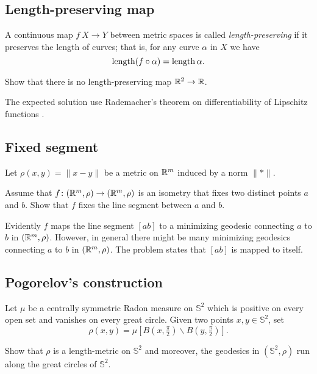 \subsection*{Length-preserving map\thm}
\label{two2one} 

A continuous map $f\:X\to Y$ between metric spaces is called \emph{length-preserving} if it preserves the length of curves; 
that is, for any curve $\alpha$ in $X$ we have
\[\operatorname{\rm length}(f\circ\alpha)=\operatorname{\rm length}\alpha.\]

\begin{pr}
Show that there is no length-preserving map $\mathbb{R}^2\to \mathbb{R}$.
\end{pr}


The expected solution use Rademacher's theorem on differentiability of Lipschitz functions \cite[see][]{rademacher}. 



\subsection*{Fixed segment}
\label{Fixed segment}

\begin{pr}
Let $\rho(x,y)=\|x-y\|$ be a metric on $\mathbb{R}^m$ induced by a norm $\|{*}\|$.

Assume that $f\colon(\mathbb{R}^m,\rho)\to(\mathbb{R}^m,\rho)$ is an isometry that fixes two distinct points $a$ and $b$.
Show that $f$ fixes the line segment between $a$ and $b$.
\end{pr}

Evidently $f$ maps the line segment $[ab]$ to a minimizing geodesic connecting $a$ to $b$ in $(\mathbb{R}^m,\rho)$.
However, in general there might be many minimizing geodesics connecting $a$ to $b$ in $(\mathbb{R}^m,\rho)$.
The problem states that $[ab]$ is mapped to itself.


\subsection*{Pogorelov's construction\easy}
\label{Pogorelov's construction}

\begin{pr}
Let $\mu$ be a centrally symmetric Radon measure on $\mathbb{S}^2$ which is positive on every open set and vanishes on every great circle.
Given two points $x,y\in \mathbb{S}^2$,
set 
\[\rho(x,y)=\mu[B(x,\tfrac \pi2)\backslash B(y,\tfrac\pi2)].\]

Show that $\rho$ is a length-metric on $\mathbb{S}^2$
and moreover, the geodesics in $(\mathbb{S}^2,\rho)$ run along the great circles of $\mathbb{S}^2$.
\end{pr}

